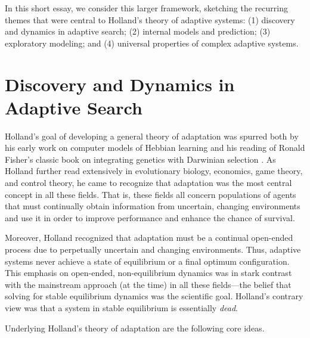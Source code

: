 \documentclass{sig-alternate}
\begin{document}
In this short essay, we consider this larger framework, sketching the
recurring themes that were central to Holland's theory of
adaptive systems: (1) discovery and 
dynamics in adaptive search; (2) internal models and prediction; (3) 
exploratory modeling; and (4) universal properties of complex adaptive systems.  

\section{Discovery and Dynamics in Adaptive Search} 

Holland's goal of developing a general theory of adaptation was
spurred both by his early work on computer models of Hebbian learning
\cite{Rochester1956} and his reading of Ronald Fisher's classic book
on integrating genetics with Darwinian selection \cite{Fisher1930}.
As Holland further read extensively in evolutionary biology,
economics, game theory, and control theory, he came to recognize that
adaptation was the most central concept in all these fields.  That is,
these fields all concern populations of agents that must continually
obtain information from uncertain, changing environments and use it in
order to improve performance and enhance the chance of survival. 

Moreover, Holland recognized that adaptation must be a continual
open-ended process due to perpetually uncertain and changing
environments.  Thus, adaptive systems never achieve a state of
equilibrium or a final optimum configuration.  This emphasis on
open-ended, non-equilibrium dynamics was in stark contrast with the
mainstream approach (at the time) in all these fields---the belief
that solving for stable equilibrium dynamics was the scientific goal.
Holland's contrary view was that a system in stable equilibrium is
essentially \emph{dead}.

Underlying Holland's theory of adaptation are the following core ideas.  
\end{document}
